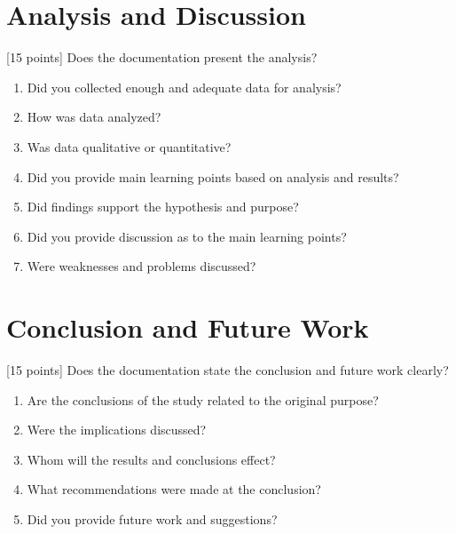 \documentclass[letterpaper,10pt,english]{sphinxmanual}
\begin{document}
\section{Analysis and Discussion}
\label{\detokenize{docs/rubric:analysis-and-discussion}}
\sphinxAtStartPar
{[}15 points{]} Does the documentation present the analysis?
\begin{enumerate}
%
\item {} 
\sphinxAtStartPar
Did you collected enough and adequate data for analysis?

\item {} 
\sphinxAtStartPar
How was data analyzed?

\item {} 
\sphinxAtStartPar
Was data qualitative or quantitative?

\item {} 
\sphinxAtStartPar
Did you provide main learning points based on analysis and results?

\item {} 
\sphinxAtStartPar
Did findings support the hypothesis and purpose?

\item {} 
\sphinxAtStartPar
Did you provide discussion as to the main learning points?

\item {} 
\sphinxAtStartPar
Were weaknesses and problems discussed?

\end{enumerate}


\section{Conclusion and Future Work}
\label{\detokenize{docs/rubric:conclusion-and-future-work}}
\sphinxAtStartPar
{[}15 points{]} Does the documentation state the conclusion and future work clearly?
\begin{enumerate}
%
\item {} 
\sphinxAtStartPar
Are the conclusions of the study related to the original purpose?

\item {} 
\sphinxAtStartPar
Were the implications discussed?

\item {} 
\sphinxAtStartPar
Whom will the results and conclusions effect?

\item {} 
\sphinxAtStartPar
What recommendations were made at the conclusion?

\item {} 
\sphinxAtStartPar
Did you provide future work and suggestions?

\end{enumerate}
\end{document}
